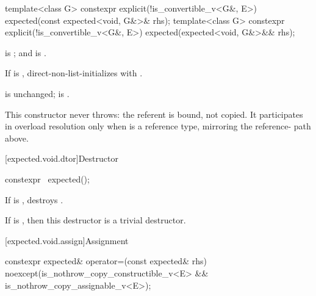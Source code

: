 %
\begin{itemdecl}
template<class G>
  constexpr explicit(!is_convertible_v<G&, E>) expected(const expected<void, G&>& rhs);
template<class G>
  constexpr explicit(!is_convertible_v<G&, E>) expected(expected<void, G&>&& rhs);
\end{itemdecl}

\begin{itemdescr}
\pnum
\constraints
{} is ; and  is .

\pnum
\effects
If  is , direct-non-list-initializes  with .

\pnum
\ensures
{} is unchanged;  is .

\pnum
\remarks
This constructor never throws: the referent is bound, not copied. It participates in overload resolution only when  is a reference type, mirroring the  reference- path above.
\end{itemdescr}

[expected.void.dtor]{Destructor}

%
\begin{itemdecl}
constexpr ~expected();
\end{itemdecl}

\begin{itemdescr}
\pnum
\effects
If  is , destroys .

\pnum
\remarks
If  is , then this destructor is a trivial destructor.
\end{itemdescr}

[expected.void.assign]{Assignment}

%
\begin{itemdecl}
constexpr expected& operator=(const expected& rhs) noexcept(is_nothrow_copy_constructible_v<E> &&
                                                            is_nothrow_copy_assignable_v<E>);
\end{itemdecl}


